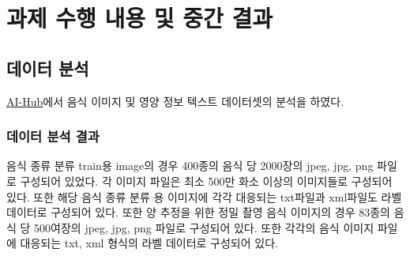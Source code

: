 \documentclass[10pt, a4paper]{article}
\theoremstyle{definition}
\begin{document}
    \section{과제 수행 내용 및 중간 결과}

    \subsection{데이터 분석}\label{subsec:데이터 분석}
    \textcolor{blue}{\underline{\href{https://www.aihub.or.kr/aihubdata/data/view.do?currMenu=115&topMenu=100&aihubDataSe=data&dataSetSn=74}{AI-Hub}}}에서 음식 이미지 및 영양 정보 텍스트 데이터셋의 분석을 하였다.

    \subsubsection{데이터 분석 결과}\label{subsubsec:데이터 분석 결과}
    음식 종류 분류 train용 image의 경우 400종의 음식 당 2000장의 jpeg, jpg, png 파일로 구성되어 있었다. 각 이미지 파일은 최소 500만 화소 이상의 이미지들로 구성되어 있다. 또한 해당 음식 종류 분류 용 이미지에 각각 대응되는 txt파일과 xml파일도 라벨 데이터로 구성되어 있다. 또한 양 추정을 위한 정밀 촬영 음식 이미지의 경우 83종의 음식 당 500여장의 jpeg, jpg, png 파일로 구성되어 있다. 또한 각각의 음식 이미지 파일에 대응되는 txt, xml 형식의 라벨 데이터로 구성되어 있다.
\end{document}
